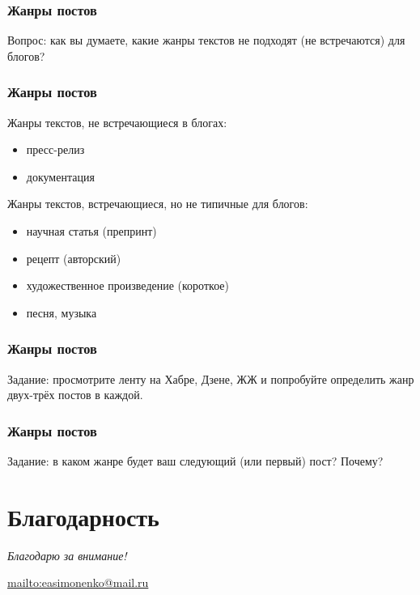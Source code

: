 \documentclass[12pt]{beamer}
\begin{document}
\begin{frame}
  \frametitle{Жанры постов}
  Вопрос: как вы думаете, какие жанры текстов не подходят (не встречаются) для блогов?
\end{frame}

\begin{frame}
  \frametitle{Жанры постов}

  Жанры текстов, не встречающиеся в блогах:
  \begin{itemize}
  \item пресс-релиз
  \item документация
  \end{itemize}

  Жанры текстов, встречающиеся, но не типичные для блогов:
  \begin{itemize}
  \item научная статья (препринт)
  \item рецепт (авторский)
  \item художественное произведение (короткое)
  \item песня, музыка
  \end{itemize}
\end{frame}

\begin{frame}
  \frametitle{Жанры постов}
  Задание: просмотрите ленту на Хабре, Дзене, ЖЖ и попробуйте определить
  жанр двух-трёх постов в каждой.
\end{frame}

\begin{frame}
  \frametitle{Жанры постов}
  Задание: в каком жанре будет ваш следующий (или первый) пост? Почему?
\end{frame}

\section*{Благодарность}

\begin{frame}
  \center
  \textit{Благодарю за внимание!}
  
  \textbf{\textsl{\inserttitle}}

  \insertauthor
  
  \url{mailto:easimonenko@mail.ru}

  \insertinstitute
\end{frame}
\end{document}
